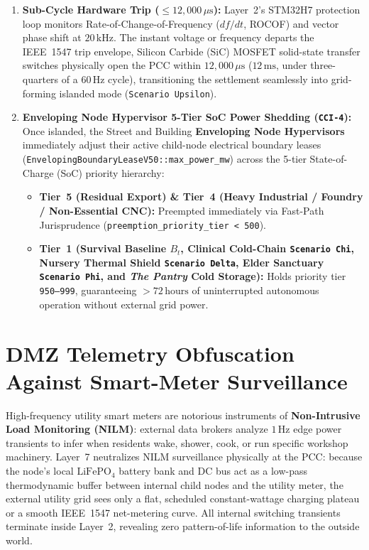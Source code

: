 \begin{enumerate}
    \item \textbf{Sub-Cycle Hardware Trip ($\le 12{,}000\,\mu\mathrm{s}$):} Layer~2's STM32H7 protection loop monitors Rate-of-Change-of-Frequency ($df/dt$, ROCOF) and vector phase shift at $20\,\mathrm{kHz}$. The instant voltage or frequency departs the IEEE~1547 trip envelope, Silicon Carbide (SiC) MOSFET solid-state transfer switches physically open the PCC within $12{,}000\,\mu\mathrm{s}$ ($12\,\mathrm{ms}$, under three-quarters of a $60\,\mathrm{Hz}$ cycle), transitioning the settlement seamlessly into grid-forming islanded mode (\texttt{Scenario Upsilon}).
    \item \textbf{Enveloping Node Hypervisor 5-Tier SoC Power Shedding (\texttt{CCI-4}):} Once islanded, the Street and Building \textbf{Enveloping Node Hypervisors} immediately adjust their active child-node electrical boundary leases (\texttt{EnvelopingBoundaryLeaseV50::max\_power\_mw}) across the 5-tier State-of-Charge (SoC) priority hierarchy:
    \begin{itemize}
        \item \textbf{Tier~5 (Residual Export) \& Tier~4 (Heavy Industrial / Foundry / Non-Essential CNC):} Preempted immediately via Fast-Path Jurisprudence (\texttt{preemption\_priority\_tier < 500}).
        \item \textbf{Tier~1 (Survival Baseline $B_t$, Clinical Cold-Chain \texttt{Scenario Chi}, Nursery Thermal Shield \texttt{Scenario Delta}, Elder Sanctuary \texttt{Scenario Phi}, and \textit{The Pantry} Cold Storage):} Holds priority tier \texttt{950--999}, guaranteeing $>72\,\mathrm{hours}$ of uninterrupted autonomous operation without external grid power.
    \end{itemize}
\end{enumerate}

\section{DMZ Telemetry Obfuscation Against Smart-Meter Surveillance}
\label{sec:l7-telemetry-obfuscation}

High-frequency utility smart meters are notorious instruments of \textbf{Non-Intrusive Load Monitoring (NILM)}: external data brokers analyze $1\,\mathrm{Hz}$ edge power transients to infer when residents wake, shower, cook, or run specific workshop machinery. Layer~7 neutralizes NILM surveillance physically at the PCC: because the node's local $\mathrm{LiFePO_4}$ battery bank and DC bus act as a low-pass thermodynamic buffer between internal child nodes and the utility meter, the external utility grid sees only a flat, scheduled constant-wattage charging plateau or a smooth IEEE~1547 net-metering curve. All internal switching transients terminate inside Layer~2, revealing zero pattern-of-life information to the outside world.
